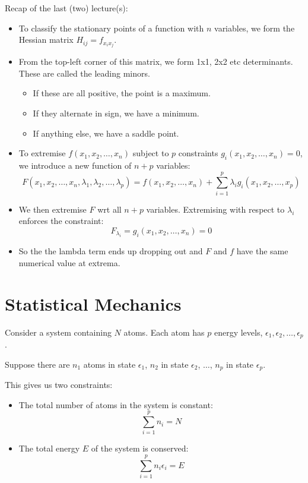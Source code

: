 
Recap of the last (two) lecture(s):
\begin{itemize}
    \item To classify the stationary points of a function with $n$ variables, we form the Hessian matrix $H_{ij} = f_{x_ix_j}$.
    \item From the top-left corner of this matrix, we form 1x1, 2x2 etc determinants. These are called the leading minors.
    \begin{itemize}
        \item If these are all positive, the point is a maximum.
        \item If they alternate in sign, we have a minimum.
        \item If anything else, we have a saddle point.
    \end{itemize}
    \item To extremise $f(x_1, x_2, \ldots, x_n)$ subject to $p$ constraints $g_i(x_1, x_2, \ldots, x_n) = 0$, we introduce a new function of $n+p$ variables:
    \[
        F(x_1, x_2, \ldots, x_n, \lambda_1, \lambda_2, \ldots, \lambda_p) = f(x_1, x_2, \ldots, x_n) + \sum_{i=1}^{p} \lambda_i g_i(x_1, x_2, \ldots, x_p)
    \]
    \item We then extremise $F$ wrt all $n+p$ variables. Extremising with respect to $\lambda_i$ enforces the constraint:
    \[
        F_{\lambda_i} = g_i(x_1, x_2, \ldots, x_n) = 0  
    \]
    \item So the the lambda term ends up dropping out and $F$ and $f$ have the same numerical value at extrema.
\end{itemize}

\section{Statistical Mechanics}
Consider a system containing $N$ atoms. Each atom has $p$ energy levels, $\epsilon_1, \epsilon_2, \ldots, \epsilon_p$.

Suppose there are $n_1$ atoms in state $\epsilon_1$, $n_2$ in state $\epsilon_2$, $\ldots$, $n_p$ in state $\epsilon_p$.

This gives us two constraints:
\begin{itemize}
    \item The total number of atoms in the system is constant:
    \[
        \sum_{i=1}^{p} n_i = N
    \]
    \item The total energy $E$ of the system is conserved:
    \[
        \sum_{i=1}^{p} n_i \epsilon_i = E
    \]
\end{itemize}

